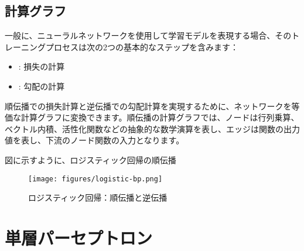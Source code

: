 \begin{content}
\subsection{計算グラフ}

一般に、ニューラルネットワークを使用して学習モデルを表現する場合、そのトレーニングプロセスは次の2つの基本的なステップを含みます：

\begin{itemize}
  \item {}: 損失の計算
  \item {}: 勾配の計算
\end{itemize}

順伝播での損失計算と逆伝播での勾配計算を実現するために、ネットワークを等価な計算グラフに変換できます。順伝播の計算グラフでは、ノードは行列乗算、ベクトル内積、活性化関数などの抽象的な数学演算を表し、エッジは関数の出力値を表し、下流のノード関数の入力となります。

図に示すように、ロジスティック回帰の順伝播

\begin{figure}[H]
\centering
\texttt{[image: figures/logistic-bp.png]}
\caption{ロジスティック回帰：順伝播と逆伝播}
 \label{fig:logistic-bp}
\end{figure}

\end{content}

\section{単層パーセプトロン}

